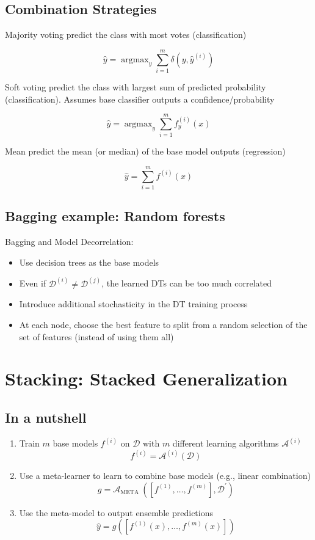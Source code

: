 \subsection{Combination Strategies}

Majority voting predict the class with most votes (classification)

\[
	\hat{y}=\operatorname{argmax}_{y}\sum_{i=1}^{m}\delta\left(y, \hat{y}^{(i)}\right
	)
\]

\noindent
Soft voting predict the class with largest sum of predicted probability (classification).
Assumes base classifier outputs a confidence/probability

\[
	\hat{y}=\operatorname{argmax}_{y}\sum_{i=1}^{m}f_{y}^{(i)}(x)
\]

\noindent
Mean predict the mean (or median) of the base model outputs (regression)

\[
	\hat{y}=\sum_{i=1}^{m}f^{(i)}(x)
\]

\subsection{Bagging example: Random forests}

Bagging and Model Decorrelation:
\begin{itemize}
	\item Use decision trees as the base models

	\item Even if $\mathcal{D}^{(i)}\neq \mathcal{D}^{(j)}$, the learned DTs can
		be too much correlated

	\item Introduce additional stochasticity in the DT training process

	\item At each node, choose the best feature to split from a random selection
		of the set of features (instead of using them all)
\end{itemize}

\section{Stacking: Stacked Generalization}

\subsection{In a nutshell}
\begin{enumerate}[]
	\item Train $m$ base models $f^{(i)}$ on $\mathcal{D}$ with $m$ different learning
		algorithms $\mathcal{A}^{(i)}$
		\[
			f^{(i)}=\mathcal{A}^{(i)}(\mathcal{D})
		\]

	\item Use a meta-learner to learn to combine base models (e.g., linear
		combination)
		\[
			g=\mathcal{A}_{\text{META }}\left(\left[f^{(1)}, \ldots, f^{(m)}\right], \mathcal{D}
			^{\prime}\right)
		\]

	\item Use the meta-model to output ensemble predictions
		\[
			\hat{y}=g\left(\left[f^{(1)}(x), \ldots, f^{(m)}(x)\right]\right)
		\]
\end{enumerate}

